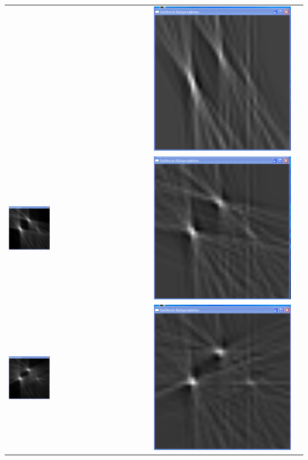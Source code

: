 \begin{center}
\begin{tabular}{p{7cm}p{7cm}c}
                & 
                \includegraphics[width=.3\textwidth, height=0.2\textheight]{pic/Einzelfenster_Bilder/unbekannte_Quelle/unbek2gef_prj.png}\\ 
                \includegraphics[width=0.3\textwidth, height=0.2\textheight]{pic/Einzelfenster_Bilder/unbekannte_Quelle/unbek3einf_prj.png}
                & 
                \includegraphics[width=.3\textwidth, height=0.2\textheight]{pic/Einzelfenster_Bilder/unbekannte_Quelle/unbek3gef_prj.png}\\               
                \includegraphics[width=0.3\textwidth, height=0.2\textheight]{pic/Einzelfenster_Bilder/unbekannte_Quelle/unbek4einf_prj.png}
                & 
                \includegraphics[width=.3\textwidth, height=0.2\textheight]{pic/Einzelfenster_Bilder/unbekannte_Quelle/unbek4gef_prj.png} \pagebreak
            \end{tabular}
            \end{center}
